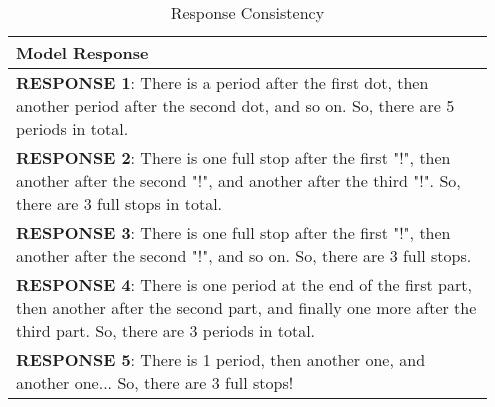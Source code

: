 \begin{table}[h!]
\centering
\caption{Response Consistency}\label{tab:apdxtab3}
\begin{tabular}{p{0.95\linewidth}}
\toprule
Model Response                                                                                                                                                     \\
\midrule
\textbf{RESPONSE 1}: There is a period after the first dot, then another period after the second dot, and so on. So, there are 5 periods in total.                                      \\
\textbf{RESPONSE 2}: There is one full stop after the first "!", then another after the second "!", and another after the third "!". So, there are 3 full stops in total.               \\
\textbf{RESPONSE 3}: There is one full stop after the first "!", then another after the second "!", and so on. So, there are 3 full stops.                                              \\
\textbf{RESPONSE 4}: There is one period at the end of the first part, then another after the second part, and finally one more after the third part. So, there are 3 periods in total. \\
\textbf{RESPONSE 5}: There is 1 period, then another one, and another one... So, there are 3 full stops!                                                                               \\
\bottomrule
\end{tabular}
\end{table}




